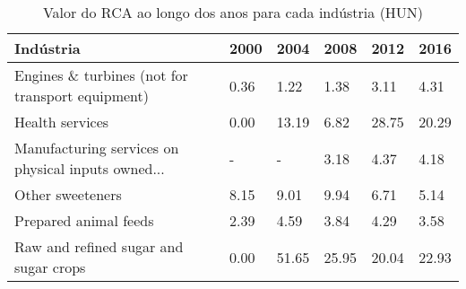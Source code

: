 \begin{table}
\centering
\caption{Valor do RCA ao longo dos anos para cada indústria (HUN)}
\label{tab:ex3-tempo-HUN}
\begin{tabular}{p{6cm}p{1.5cm}p{1.5cm}p{1.5cm}p{1.5cm}p{1.5cm}}
\toprule
                                         Indústria & 2000 &  2004 &  2008 &  2012 &  2016 \\
\midrule
  Engines \& turbines (not for transport equipment) & 0.36 &  1.22 &  1.38 &  3.11 &  4.31 \\
                                   Health services & 0.00 & 13.19 &  6.82 & 28.75 & 20.29 \\
Manufacturing services on physical inputs owned... &    - &     - &  3.18 &  4.37 &  4.18 \\
                                  Other sweeteners & 8.15 &  9.01 &  9.94 &  6.71 &  5.14 \\
                             Prepared animal feeds & 2.39 &  4.59 &  3.84 &  4.29 &  3.58 \\
             Raw and refined sugar and sugar crops & 0.00 & 51.65 & 25.95 & 20.04 & 22.93 \\
\bottomrule
\end{tabular}
\end{table}
